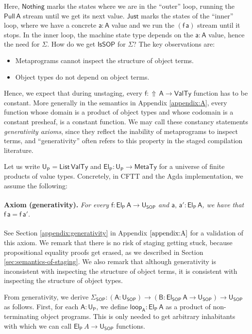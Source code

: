 \documentclass[acmsmall]{acmart}
\newcommand{\msf}[1]{{\mathsf{#1}}}
\newcommand{\vA}{\mathsf{A}}
\newcommand{\vB}{\mathsf{B}}
\newcommand{\va}{\mathsf{a}}
\newcommand{\vf}{\mathsf{f}}
\newcommand{\SOP}{\msf{SOP}}
\newcommand{\El}{\msf{El}}
\newcommand{\USOP}{\msf{U}_{\msf{SOP}}}
\newcommand{\Uprod}{\msf{U_P}}
\newcommand{\Elprod}{\msf{El_{P}}}
\newcommand{\IsSOP}{\msf{IsSOP}}
\newcommand{\List}{\msf{List}}
\newcommand{\Lift}{{\Uparrow}}
\newcommand{\MTy}{\msf{MetaTy}}
\newcommand{\VTy}{\msf{ValTy}}
\newcommand{\Nothing}{\msf{Nothing}}
\newcommand{\Just}{\msf{Just}}
\theoremstyle{remark}
\newcommand{\Pull}{\msf{Pull}}
\begin{document}
Here, $\Nothing$ marks the states where we are in the ``outer'' loop, running
the $\Pull\,\vA$ stream until we get its next value. $\Just$ marks the states of
the ``inner'' loop, where we have a concrete $\va : \vA$ value and we run the
$(\vf\,\va)$ stream until it stops. In the inner loop, the machine state type
depends on the $\va : \vA$ value, hence the need for $\Sigma$. How do we get
$\IsSOP$ for $\Sigma$? The key observations are:
\begin{itemize}
 \item Metaprograms cannot inspect the structure of object terms.
 \item Object types do not depend on object terms.
\end{itemize}
Hence, we expect that during unstaging, every $\vf : \Lift\,\vA \to \VTy$
function has to be constant. More generally in the semantics in Appendix \ref{appendix:A}, every function whose domain is a product
of object types and whose codomain is a constant presheaf, is a constant
function. We may call these constancy statements \emph{generativity axioms},
since they reflect the inability of metaprograms to inspect terms, and
``generativity'' often refers to this property in the staged compilation
literature.

Let us write $\Uprod = \List\,\VTy$ and $\Elprod : \Uprod \to \MTy$ for a
universe of finite products of value types. Concretely, in CFTT and the Agda
implementation, we assume the following:
\\\\
\noindent \textbf{Axiom (generativity).}\textit{ For every $\vf : \Elprod\,\vA \to \USOP$ and $\va,\,\va' : \Elprod\,\vA$,
we have that $\vf\,\va = \vf\,\va'$.}
\\\\
See Section \ref{appendix:generativity} in Appendix $\ref{appendix:A}$ for a
validation of this axiom. We remark that there is no risk of staging getting
stuck, because propositional equality proofs get erased, as we described in
Section \ref{sec:semantics-of-staging}. We also remark that although
generativity is inconsistent with inspecting the structure of object terms, it
is consistent with inspecting the structure of object types.

From generativity, we derive $\Sigma_\SOP : (\vA : \USOP) \to (\vB : \El_\SOP\,\vA \to \USOP)
\to \USOP$ as follows. First, for each $\vA : \Uprod$, we define $\msf{loop_{\vA}} :
\Elprod\,\vA$ as a product of non-terminating object programs. This is only needed
to get arbitrary inhabitants with which we can call $\Elprod\,A \to \USOP$
functions.
\end{document}
